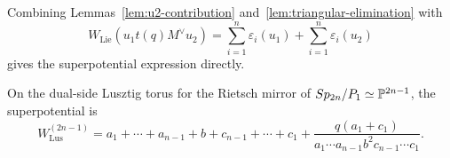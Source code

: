 Combining Lemmas~\ref{lem:u2-contribution} and~\ref{lem:triangular-elimination} with
\[
W_{\mathrm{Lie}}(u_1t(q)M^\vee u_2)
=
\sum_{i=1}^n\varepsilon_i(u_1)
+
\sum_{i=1}^n\varepsilon_i(u_2)
\]
gives the superpotential expression directly.

\begin{thm}\label{thm:lusztig-potential}
On the dual-side Lusztig torus for the Rietsch mirror of \(Sp_{2n}/P_1\simeq\mathbb{P}^{2n-1}\), the superpotential is
\[
W_{\mathrm{Lus}}^{(2n-1)}
=a_1+\cdots+a_{n-1}+b+c_{n-1}+\cdots+c_1
+\frac{q(a_1+c_1)}{a_1\cdots a_{n-1}b^2c_{n-1}\cdots c_1}.
\]
\end{thm}

